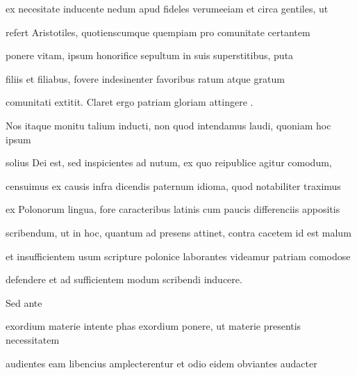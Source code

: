 
\renewcommand{\theFancyVerbLine}{03-\arabic{FancyVerbLine}\phantom{a}}
\begin{VerbatimLatin}[firstnumber=17]
ex necesitate inducente nedum apud fideles verumeeiam et circa gentiles, ut

refert Aristotiles, quotienscumque quempiam pro comunitate certantem 

 ponere vitam, ipsum honorifice sepultum in suis superstitibus, puta

filiis et filiabus, fovere indesinenter favoribus ratum atque gratum

comunitati extitit. Claret ergo patriam  gloriam attingere .{\color{red}\footnotemark[6]}

\indentP Nos itaque monitu talium inducti, non quod intendamus laudi, quoniam hoc ipsum

solius Dei est, sed inspicientes ad nutum, ex quo reipublice agitur comodum,

censuimus ex causis infra dicendis paternum idioma, quod notabiliter traximus

ex Polonorum lingua, fore caracteribus latinis cum paucis differenciis appositis

scribendum, ut in hoc, quantum ad presens attinet, contra cacetem{\color{red}\footnotemark[7]} id est malum

et insufficientem usum scripture polonice laborantes videamur patriam comodose
\end{VerbatimLatin}


\renewcommand{\theFancyVerbLine}{\textcolor{green}{03-28\alph{FancyVerbLine}}}

\begin{VerbatimLatin}[firstnumber=1]
defendere et ad sufficientem modum scribendi inducere.

\indentK Sed ante
\end{VerbatimLatin}

\renewcommand{\theFancyVerbLine}{03-\arabic{FancyVerbLine}\phantom{a}}
\begin{VerbatimLatin}[firstnumber=29]
exordium materie intente phas exordium ponere, ut materie presentis necessitatem

audientes eam libencius amplecterentur et odio eidem obviantes audacter
\end{VerbatimLatin}
\renewcommand{\theFancyVerbLine}{\textcolor{green}{03-31\alph{FancyVerbLine}}}

